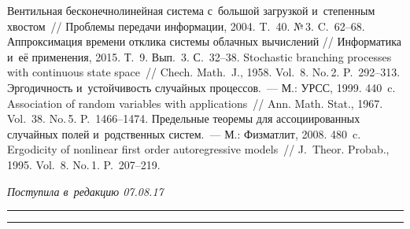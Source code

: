 \begin{multicols}{2}
{{\begin{thebibliography}{99}
 Вентильная бесконечнолинейная сис\-те\-ма
с~большой за\-груз\-кой и~степенным хвостом~// Проб\-ле\-мы передачи
информации, 2004. T.~40. №\,3. C.~62--68.
Аппроксимация времени отклика сис\-те\-мы облач\-ных вы\-чис\-ле\-ний //
Информатика и~её применения, 2015. Т.~9. Вып.~3. С.~32--38.
 Stochastic branching processes with continuous
state space~// Chech. Math.~J., 1958. Vol.~8. No.\,2. P.~292--313.
 Эргодичность и~устой\-чи\-вость случайных процессов.~---
М.: УРСС, 1999. 440~c.
 Association of random variables
with applications~// Ann. Math. Stat., 1967. Vol.~38. No.\,5. P.~1466--1474.
 Предельные тео\-ре\-мы для ассоциированных
случайных полей и~родственных сис\-тем.~--- М.: Физматлит, 2008. 480~c.
 Ergodicity of nonlinear first order
autoregressive models~// J.~Theor. Probab., 1995. Vol.~8. No.\,1. P.~207--219.
 \end{thebibliography}

 }
 }

\end{multicols}

\vspace*{-6pt}

\hfill{\small\textit{Поступила в~редакцию 07.08.17}}

\vspace*{6pt}



\hrule

\vspace*{2pt}

\hrule



\def\tit{MAXIMAL BRANCHING PROCESSES IN~RANDOM ENVIRONMENT}


\def\titkol{Maximal branching processes in~random environment}

